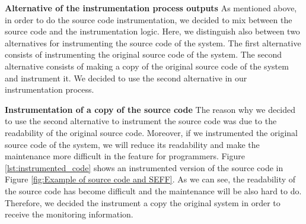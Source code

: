 \textbf{Alternative of the instrumentation process outputs}
As mentioned above, in order to do the source code instrumentation, we decided to mix between the source code and the instrumentation logic.  Here, we distinguish also between two alternatives for instrumenting the source code of the system. The first alternative consists of instrumenting the original source code of the system. The second alternative consists of making a copy of the original source code of the system and instrument it. We decided to use the second alternative in our instrumentation process. 

\textbf{Instrumentation of a copy of the source code}
The reason why we decided to use the second alternative to instrument the source code was due to the readability of the original source code. Moreover, if we instrumented the original source code of the system, we will reduce its readability and make the maintenance more difficult in the feature for programmers. Figure \ref{lst:instrumented_code} shows an instrumented version of the source code in Figure \ref{fig:Example of source code and SEFF}. As we can see, the readability of the source code has become difficult and the maintenance will be also hard to do. Therefore, we decided the instrument a copy the original system in order to receive the monitoring information.


